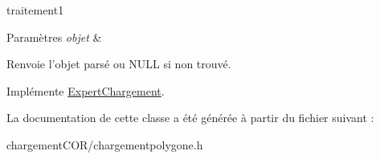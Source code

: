 traitement1 


\begin{DoxyParams}{Paramètres}
{\em objet} & \\
\hline
\end{DoxyParams}
\begin{DoxyReturn}{Renvoie}
l'objet parsé ou N\+U\+L\+L si non trouvé. 
\end{DoxyReturn}


Implémente \hyperlink{class_expert_chargement_a7d7818bdd5f0a06b06bfc8047ec8fee5}{Expert\+Chargement}.



La documentation de cette classe a été générée à partir du fichier suivant \+:\begin{DoxyCompactItemize}
\item 
chargement\+C\+O\+R/chargementpolygone.\+h\end{DoxyCompactItemize}
